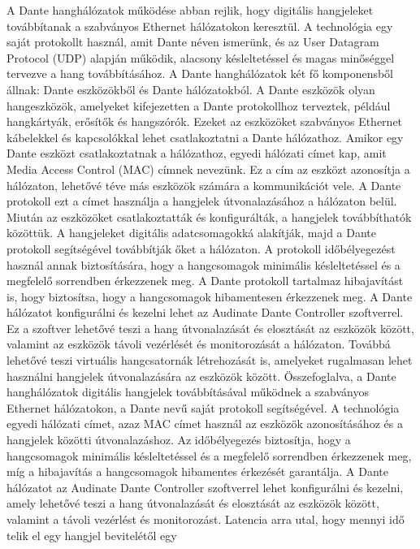 A Dante hanghálózatok működése abban rejlik, hogy digitális hangjeleket
továbbítanak a szabványos Ethernet hálózatokon keresztül. A technológia egy
saját protokollt használ, amit Dante néven ismerünk, és az User Datagram
Protocol (UDP) alapján működik, alacsony késleltetéssel és magas minőséggel
tervezve a hang továbbításához. A Dante hanghálózatok két fő komponensből állnak:
Dante eszközökből és Dante hálózatokból. A Dante eszközök olyan hangeszközök,
amelyeket kifejezetten a Dante protokollhoz terveztek, például hangkártyák,
erősítők és hangszórók. Ezeket az eszközöket szabványos Ethernet kábelekkel és
kapcsolókkal lehet csatlakoztatni a Dante hálózathoz. Amikor egy Dante eszközt
csatlakoztatnak a hálózathoz, egyedi hálózati címet kap, amit Media Access
Control (MAC) címnek nevezünk. Ez a cím az eszközt azonosítja a hálózaton,
lehetővé téve más eszközök számára a kommunikációt vele. A Dante protokoll ezt a
címet használja a hangjelek útvonalazásához a hálózaton belül. Miután az
eszközöket csatlakoztatták és konfigurálták, a hangjelek továbbíthatók közöttük.
A hangjeleket digitális adatcsomagokká alakítják, majd a Dante protokoll
segítségével továbbítják őket a hálózaton. A protokoll időbélyegezést használ
annak biztosítására, hogy a hangcsomagok minimális késleltetéssel és a megfelelő
sorrendben érkezzenek meg. A Dante protokoll tartalmaz hibajavítást is, hogy
biztosítsa, hogy a hangcsomagok hibamentesen érkezzenek meg. A Dante hálózatot
konfigurálni és kezelni lehet az Audinate Dante Controller szoftverrel. Ez a
szoftver lehetővé teszi a hang útvonalazását és elosztását az eszközök között,
valamint az eszközök távoli vezérlését és monitorozását a hálózaton. Továbbá
lehetővé teszi virtuális hangcsatornák létrehozását is, amelyeket rugalmasan
lehet használni hangjelek útvonalazására az eszközök között. Összefoglalva, a
Dante hanghálózatok digitális hangjelek továbbításával működnek a szabványos
Ethernet hálózatokon, a Dante nevű saját protokoll segítségével. A technológia
egyedi hálózati címet, azaz MAC címet használ az eszközök azonosításához és a
hangjelek közötti útvonalazáshoz. Az időbélyegezés biztosítja, hogy a
hangcsomagok minimális késleltetéssel és a megfelelő sorrendben érkezzenek meg,
míg a hibajavítás a hangcsomagok hibamentes érkezését garantálja. A Dante
hálózatot az Audinate Dante Controller szoftverrel lehet konfigurálni és kezelni,
amely lehetővé teszi a hang útvonalazását és elosztását az eszközök között,
valamint a távoli vezérlést és monitorozást.
Latencia arra utal, hogy mennyi idő telik el egy hangjel bevitelétől egy
